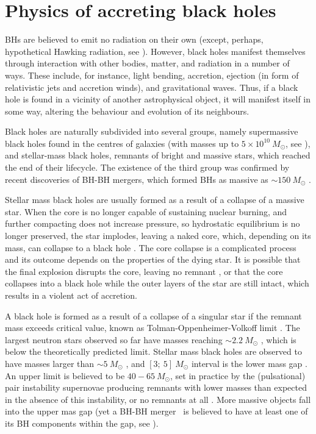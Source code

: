 \chapter{Physics of accreting black holes}
\Glspl{BH} are believed to emit no radiation on their own (except, perhaps, hypothetical Hawking radiation, see \citealt{Hawking1974}). 
However, black holes manifest themselves through interaction with other bodies, matter, and radiation in a number of ways.
These include, for instance, light bending, accretion, ejection (in form of relativistic jets and accretion winds), and gravitational waves.
Thus, if a black hole is found in a vicinity of another astrophysical object, it will manifest itself in some way, altering the behaviour and evolution of its neighbours.

Black holes are naturally subdivided into several groups, namely supermassive black holes found in the centres of galaxies (with masses up to $5\times10^{10}~M_\odot$, see \citealt{Shemmer2004, Mehrgan2019}), and stellar-mass black holes, remnants of bright and massive stars, which reached the end of their lifecycle.
The existence of the third group was confirmed by recent discoveries of \gls{BH}-\gls{BH} mergers, which formed \glspl{BH} as massive as $\sim 150~M_\odot$ \citep{Abbott2020}.

Stellar mass black holes are usually formed as a result of a collapse of a massive star.
When the core is no longer capable of sustaining nuclear burning, and further compacting does not increase pressure, so hydrostatic equilibrium is no longer preserved, the star implodes, leaving a naked core, which, depending on its mass, can collapse to a black hole \citep{Woosley2002}.
The core collapse is a complicated process and its outcome depends on the properties of the dying star.
It is possible that the final explosion disrupts the core, leaving no remnant \citep{Kasen2011}, or that the core collapses into a black hole while the outer layers of the star are still intact, which results in a violent act of accretion.

A black hole is formed as a result of a collapse of a singular star if the remnant mass exceeds critical value, known as Tolman-Oppenheimer-Volkoff limit \citep{Tolman1939,Oppenheimer1939,Oppenheimer1939a}.
The largest neutron stars observed so far have masses reaching $\sim 2.2~M_\odot$ \citep{Cromartie2020}, which is below the theoretically predicted limit.
Stellar mass black holes are observed to have masses larger than $\sim 5~M_\odot$ \citep{Ozel2010}, and $[3;~5]~M_\odot$ interval is the lower mass gap \citep{Farr2011, Kreidberg2012}.
An upper limit is believed to be $40 - 65~M_\odot$, set in practice by the (pulsational) pair instability supernovae producing remnants with lower masses than expected in the absence of this instability, or no remnants at all \citep{Woosley2017, Woosley2019}.
More massive objects fall into the upper mas gap (yet a \gls{BH}-\gls{BH} merger \GWxix\ is believed to have at least one of its \gls{BH} components within the gap, see \citealt{LIGOVIRGO2020}).

